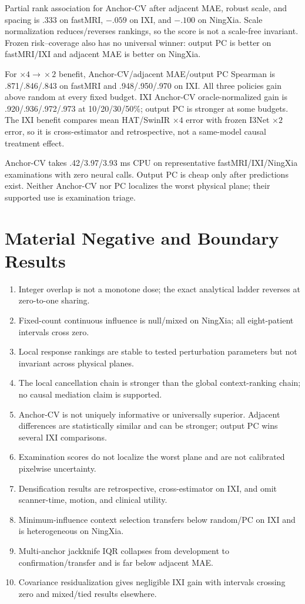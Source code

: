 \documentclass[10pt,twocolumn,letterpaper]{article}
\begin{document}
Partial rank association for Anchor-CV after adjacent MAE, robust scale, and spacing is .333 on fastMRI, $-.059$ on IXI, and $-.100$ on NingXia. Scale normalization reduces/reverses rankings, so the score is not a scale-free invariant. Frozen risk--coverage also has no universal winner: output PC is better on fastMRI/IXI and adjacent MAE is better on NingXia.

For $\times4\!\rightarrow\!\times2$ benefit, Anchor-CV/adjacent MAE/output PC Spearman is .871/.846/.843 on fastMRI and .948/.950/.970 on IXI. All three policies gain above random at every fixed budget. IXI Anchor-CV oracle-normalized gain is .920/.936/.972/.973 at 10/20/30/50\%; output PC is stronger at some budgets. The IXI benefit compares mean HAT/SwinIR $\times4$ error with frozen I3Net $\times2$ error, so it is cross-estimator and retrospective, not a same-model causal treatment effect.

Anchor-CV takes .42/3.97/3.93 ms CPU on representative fastMRI/IXI/NingXia examinations with zero neural calls. Output PC is cheap only after predictions exist. Neither Anchor-CV nor PC localizes the worst physical plane; their supported use is examination triage.

\section{Material Negative and Boundary Results}
\begin{enumerate}
\item Integer overlap is not a monotone dose; the exact analytical ladder reverses at zero-to-one sharing.
\item Fixed-count continuous influence is null/mixed on NingXia; all eight-patient intervals cross zero.
\item Local response rankings are stable to tested perturbation parameters but not invariant across physical planes.
\item The local cancellation chain is stronger than the global context-ranking chain; no causal mediation claim is supported.
\item Anchor-CV is not uniquely informative or universally superior. Adjacent differences are statistically similar and can be stronger; output PC wins several IXI comparisons.
\item Examination scores do not localize the worst plane and are not calibrated pixelwise uncertainty.
\item Densification results are retrospective, cross-estimator on IXI, and omit scanner-time, motion, and clinical utility.
\item Minimum-influence context selection transfers below random/PC on IXI and is heterogeneous on NingXia.
\item Multi-anchor jackknife IQR collapses from development to confirmation/transfer and is far below adjacent MAE.
\item Covariance residualization gives negligible IXI gain with intervals crossing zero and mixed/tied results elsewhere.
\end{enumerate}
\end{document}
